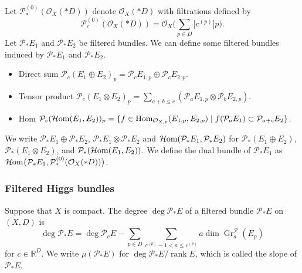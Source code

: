 \documentclass[10pt,a4paper]{amsart}
\numberwithin{equation}{section}
\newcommand{\R}{\mathbb{R}}
\newcommand{\rk}{\operatorname{rank}}
\newcommand{\Hom}{\operatorname{Hom}}
\newcommand{\sheafhom}{\operatorname{\mathcal{H}{\rm om}}}
\newcommand{\strsheaf}{\mathcal{O}}
\newcommand{\gr}{\operatorname{\mathrm{Gr}}}
\begin{document}
Let $\mathcal{P}_{*}^{(0)} (\strsheaf_{X} (*D))$ denote $\strsheaf_{X}(*D)$ with filtrations defined by
\[
\mathcal{P}_{c}^{(0)} (\strsheaf_{X}(*D)) = \strsheaf_{X} \biggl(\sum_{p\in D} \bigl[c^{(p)}\bigr]p\biggr).
\]
Let $\mathcal{P}_* E_1$ and $\mathcal{P}_* E_2$ be filtered bundles. We can define some filtered bundles induced by $\mathcal{P}_* E_1$ and $\mathcal{P}_* E_2$.
\begin{itemize}\itemsep=0pt
 \item Direct sum
$\mathcal{P}_{c}(E_1\oplus E_2)_p = \mathcal{P}_{c}E_{1,p} \oplus \mathcal{P}_{c}E_{2,p}$.
 \item Tensor product
$\mathcal{P}_{c}(E_1\otimes E_2)_p = \sum_{a+b\leq c} (\mathcal{P}_{a}E_{1,p} \otimes \mathcal{P}_{b}E_{2,p})$.
 \item Hom
$\mathcal{P}_{c}(\sheafhom(E_1,E_2))_p = \{f\in \Hom_{\strsheaf_{X,p}}(E_{1,p},E_{2,p})\mid f(\mathcal{P}_{a}E_{1})\subset\mathcal{P}_{a+c}E_{2} \}$.
\end{itemize}
We write $\mathcal{P}_{*}E_1\oplus \mathcal{P}_{*}E_2$, $\mathcal{P}_{*}E_1\otimes \mathcal{P}_{*}E_2$ and $\sheafhom(\mathcal{P}_{*} E_1,\mathcal{P}_{*} E_2)$ for $\mathcal{P}_{*}(E_1\oplus E_2)$, $\mathcal{P}_{*}(E_1\otimes E_2)$, and $\mathcal{P}_{*}(\sheafhom(E_1,E_2))$. We define the dual bundle of $\mathcal{P}_{*} E_{1}$ as $\sheafhom\bigl(\mathcal{P}_{*} E_1,\mathcal{P}_{*}^{(0)} (\strsheaf_{X} (*D))\bigr)$.

\subsubsection{Filtered Higgs bundles}
\begin{Definition}
 Suppose that $X$ is compact.
 The degree $\deg{\mathcal{P}_{*}E}$ of a filtered bundle $\mathcal{P}_{*} E$ on~$(X,D)$ is
 \[
 \deg{\mathcal{P}_{*}E} = \deg{\mathcal{P}_{c}E} - \sum_{p\in D}\sum_{c^{(p)}-1<a\leq c^{(p)}} a\dim\gr_{a}^{\mathcal{P}} (E_p)
 \]
for $c\in\R^D$. We write $\mu(\mathcal{P}_{*} E)$ for $\deg{\mathcal{P}_{*} E}/\rk{E}$, which is called the slope of $\mathcal{P}_{*} E$.
\end{Definition}
\end{document}
